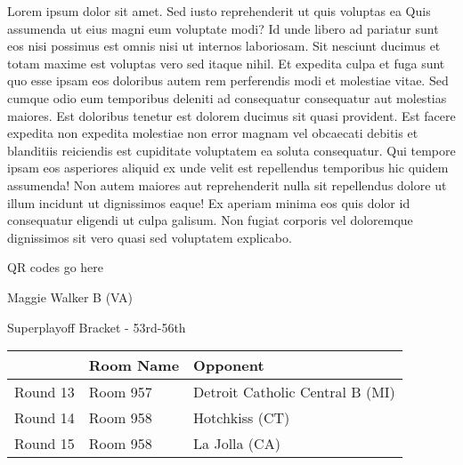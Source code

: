 \documentclass{article}%
\begin{document}
\vspace*{8pt}%
\linebreak%
\newline%
\newline%
Lorem ipsum dolor sit amet. Sed iusto reprehenderit ut quis voluptas ea Quis assumenda ut eius magni eum voluptate modi? Id unde libero ad pariatur sunt eos nisi possimus est omnis nisi ut internos laboriosam. Sit nesciunt ducimus et totam maxime est voluptas vero sed itaque nihil. Et expedita culpa et fuga sunt quo esse ipsam eos doloribus autem rem perferendis modi et molestiae vitae.\newline%
\newline%
Sed cumque odio eum temporibus deleniti ad consequatur consequatur aut molestias maiores. Est doloribus tenetur est dolorem ducimus sit quasi provident. Est facere expedita non expedita molestiae non error magnam vel obcaecati debitis et blanditiis reiciendis est cupiditate voluptatem ea soluta consequatur. Qui tempore ipsam eos asperiores aliquid ex unde velit est repellendus temporibus hic quidem assumenda!\newline%
\newline%
Non autem maiores aut reprehenderit nulla sit repellendus dolore ut illum incidunt ut dignissimos eaque! Ex aperiam minima eos quis dolor id consequatur eligendi ut culpa galisum. Non fugiat corporis vel doloremque dignissimos sit vero quasi sed voluptatem explicabo.\newline%
\newline%
%
\vspace*{30pt}%
\begin{center}%
\begin{Huge}%
QR codes go here%
\end{Huge}%
\end{center}%
\newpage%
\begin{center}%
\begin{Huge}%
Maggie Walker B (VA)%
\end{Huge}%
\vspace*{8pt}%
\linebreak%
\begin{Large}%
Superplayoff Bracket {-} 53rd{-}56th%
\end{Large}%
\end{center}%
%
\begin{tabularx}{\textwidth}{|c|Y|Y|}%
\hline%
&Room Name&Opponent\\%
\hline%
Round 13&Room 957&Detroit Catholic Central B (MI)\\%
Round 14&Room 958&Hotchkiss (CT)\\%
Round 15&Room 958&La Jolla (CA)\\%
\hline%
\end{tabularx}%
\end{document}
